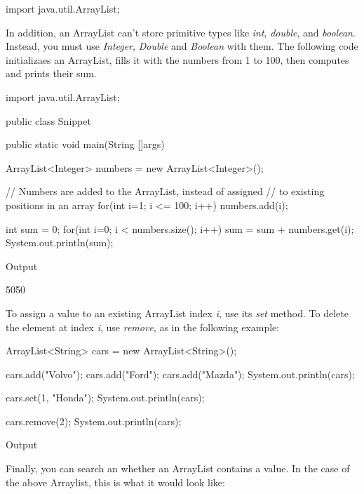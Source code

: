 \begin{code}
import java.util.ArrayList;
\end{code}

In addition, an ArrayList can't store primitive types like \textit{int}, \textit{double}, and \textit{boolean}. Instead, you must use \textit{Integer}, \textit{Double} and \textit{Boolean} with them. The following code initializaes an ArrayList, fills it with the numbers from 1 to 100, then computes and prints their sum.


\begin{code}
import java.util.ArrayList;

public class Snippet{

    public static void main(String []args){
        ArrayList<Integer> numbers = new ArrayList<Integer>();

        // Numbers are added to the ArrayList, instead of assigned
        // to existing positions in an array
        for(int i=1; i <= 100; i++){
            numbers.add(i);
        }
        
        int sum = 0;
        for(int i=0; i < numbers.size(); i++){
            sum = sum + numbers.get(i);
        }
    System.out.println(sum);
    }
}
\end{code}

Output
\begin{code}
5050
\end{code}

To assign a value to an existing ArrayList index \textit{i}, use its \textit{set} method. To delete the element at index \textit{i}, use \textit{remove}, as in the following example:

\begin{code}
ArrayList<String> cars = new ArrayList<String>();

cars.add("Volvo");
cars.add("Ford");
cars.add("Mazda");
System.out.println(cars); 

cars.set(1, "Honda");
System.out.println(cars); 

cars.remove(2);
System.out.println(cars); 
\end{code}

Output
\begin{code}
\end{code}


Finally, you can search an whether an ArrayList contains a value. In the case of the above Arraylist, this is what it would look like:

